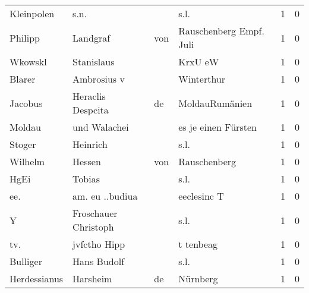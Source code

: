 \documentclass[10pt,a4paper,landscape]{article}
\begin{document}
\begin{longtable}{llllrr}
               Kleinpolen &                               s.n. &             &                                        s.l. &          1 &         0 \\
                  Philipp &                           Landgraf &         von &                     Rauschenberg Empf. Juli &          1 &         0 \\
                  Wkowskl &                         Stanislaus &             &                                     KrxU eW &          1 &         0 \\
                   Blarer &                        Ambrosius v &             &                                  Winterthur &          1 &         0 \\
                  Jacobus &                  Heraclis Despcita &          de &                              MoldauRumänien &          1 &         0 \\
                   Moldau &                       und Walachei &             &                         es je einen Fürsten &          1 &         0 \\
                   Stoger &                           Heinrich &             &                                        s.l. &          1 &         0 \\
                  Wilhelm &                             Hessen &         von &                                Rauschenberg &          1 &         0 \\
                     HgEi &                             Tobias &             &                                        s.l. &          1 &         0 \\
                      ee. &                    am. eu ..budiua &             &                                 eeclesinc T &          1 &         0 \\
                        Y &               Froschauer Christoph &             &                                        s.l. &          1 &         0 \\
                      tv. &                       jvfctho Hipp &             &                                   t tenbeag &          1 &         0 \\
                 Bulliger &                        Hans Budolf &             &                                        s.l. &          1 &         0 \\
             Herdessianus &                           Harsheim &          de &                                    Nürnberg &          1 &         0 \\

\end{longtable}
\end{document}
